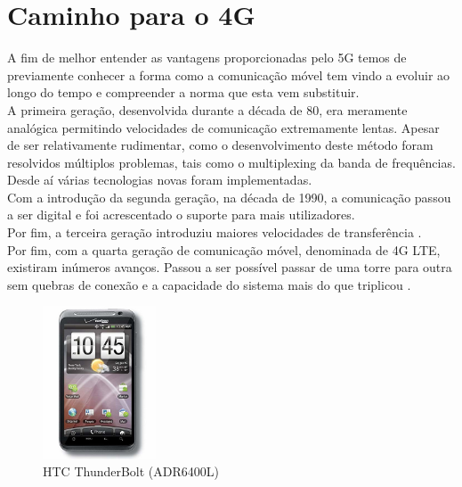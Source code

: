 \documentclass{llncs}
\begin{document}
\section{Caminho para o 4G}
A fim de melhor entender as vantagens proporcionadas pelo 5G temos
de previamente conhecer a forma como a comunicação móvel tem vindo a
evoluir ao longo do tempo e compreender a norma que esta vem
substituir.\\
A primeira geração, desenvolvida durante a década de 80, era meramente
analógica permitindo velocidades de comunicação extremamente lentas.
Apesar de ser relativamente rudimentar, como o desenvolvimento deste
método foram resolvidos múltiplos problemas, tais como o multiplexing
da banda de frequências. Desde aí várias tecnologias novas foram
implementadas.\\
Com a introdução da segunda geração, na década de 1990, a comunicação
passou a ser digital e foi acrescentado o suporte para mais
utilizadores.\\
Por fim, a terceira geração introduziu maiores
velocidades de transferência\cite{Kaleem12} .\\
Por fim, com a quarta geração de comunicação móvel, denominada de 4G
LTE, existiram inúmeros avanços.
Passou a ser possível passar de uma torre para outra sem quebras de
conexão e a capacidade do sistema mais do que triplicou \cite{Choi06}.

\begin{figure}
  \centering
  \includegraphics[width=0.30\textwidth]{images/thunderbolt.jpg}
  \caption{HTC ThunderBolt (ADR6400L)}
  \label{fig:thunderbolt}
\end{figure}
\end{document}
